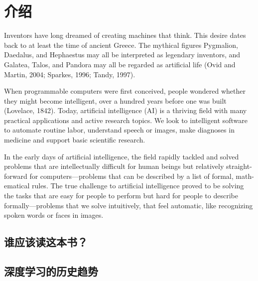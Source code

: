 
\chapter{介绍}
\label{ch:intro}

Inventors have long dreamed of creating machines that think. This desire dates
back to at least the time of ancient Greece. The mythical ﬁgures Pygmalion,
Daedalus, and Hephaestus may all be interpreted as legendary inventors, and
Galatea, Talos, and Pandora may all be regarded as artiﬁcial life (Ovid and Martin,
2004; Sparkes, 1996; Tandy, 1997).

When programmable computers were ﬁrst conceived, people wondered whether
they might become intelligent, over a hundred years before one was built (Lovelace,
1842). Today, artiﬁcial intelligence (AI) is a thriving ﬁeld with many practical
applications and active research topics. We look to intelligent software to automate
routine labor, understand speech or images, make diagnoses in medicine and
support basic scientiﬁc research.

In the early days of artiﬁcial intelligence, the ﬁeld rapidly tackled and solved
problems that are intellectually diﬃcult for human beings but relatively straight-
forward for computers—problems that can be described by a list of formal, math-
ematical rules. The true challenge to artiﬁcial intelligence proved to be solving
the tasks that are easy for people to perform but hard for people to describe
formally—problems that we solve intuitively, that feel automatic, like recognizing
spoken words or faces in images.

\section{谁应该读这本书？}

\section{深度学习的历史趋势}
